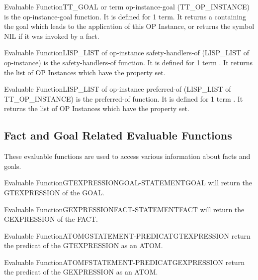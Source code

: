 \begin{typeefa}{Evaluable Function}{TT\_GOAL or term} {op-instance-goal} {(TT\_OP\_INSTANCE)}
is the op-instance-goal function. It is defined for 1 term. It returns a
 containing the goal which leads to the application of this OP
Instance, or returns the symbol NIL if it was invoked by a fact.
\end{typeefa}

\begin{typeefa}{Evaluable Function}{LISP\_LIST of op-instance} {safety-handlers-of}
{(LISP\_LIST of op-instance)}
is the safety-handlers-of function. It is defined for 1 term
. It returns the list of OP Instances which have the property
 set.
\end{typeefa}

\begin{typeefa}{Evaluable Function}{LISP\_LIST of op-instance} {preferred-of}
{(LISP\_LIST of TT\_OP\_INSTANCE)} 
is the preferred-of function. It is defined for 1 term . It
returns the list of OP Instances which have the property 
set.
\end{typeefa}

\subsection{Fact and Goal Related Evaluable Functions}

These evaluable functions are used to access various information about facts
and goals.

\begin{typeefa}{Evaluable Function}{GTEXPRESSION}{GOAL-STATEMENT}{GOAL}
will return the GTEXPRESSION of the GOAL.
\end{typeefa}

\begin{typeefa}{Evaluable Function}{GEXPRESSION}{FACT-STATEMENT}{FACT}
will return the GEXPRESSION of the FACT.
\end{typeefa}

\begin{typeefa}{Evaluable Function}{ATOM}{GSTATEMENT-PREDICAT}{GTEXPRESSION}
return the predicat of the GTEXPRESSION as an ATOM.
\end{typeefa}

\begin{typeefa}{Evaluable Function}{ATOM}{FSTATEMENT-PREDICAT}{GEXPRESSION}
return the predicat of the GEXPRESSION as an ATOM.
\end{typeefa}

